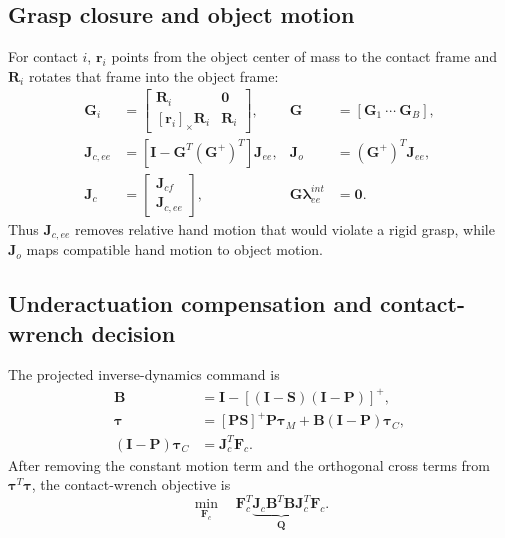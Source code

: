 \documentclass[11pt]{article}
\newcommand{\vect}[1]{\bm{#1}}
\newcommand{\skewm}[1]{[#1]_{\times}}
\newcommand{\pinv}{^{+}}
\begin{document}
\subsection*{Grasp closure and object motion}
For contact $i$, $\vect r_i$ points from the object center of mass to the
contact frame and $\vect R_i$ rotates that frame into the object frame:
\begin{align}
\vect G_i&=
\begin{bmatrix}
\vect R_i&\vect0\\
\skewm{\vect r_i}\vect R_i&\vect R_i
\end{bmatrix},
&\vect G&=[\vect G_1\ \cdots\ \vect G_B], \tag{PIDC-09}\\
\vect J_{c,ee}
&=\left[\vect I-\vect G^T(\vect G\pinv)^T\right]\vect J_{ee},
&\vect J_o&=(\vect G\pinv)^T\vect J_{ee}, \tag{PIDC-10}\\
\vect J_c&=
\begin{bmatrix}\vect J_{cf}\\\vect J_{c,ee}\end{bmatrix},
&\vect G\vect\lambda_{ee}^{int}&=\vect0. \tag{PIDC-11}
\end{align}
Thus $\vect J_{c,ee}$ removes relative hand motion that would violate a rigid
grasp, while $\vect J_o$ maps compatible hand motion to object motion.

\subsection*{Underactuation compensation and contact-wrench decision}
The projected inverse-dynamics command is
\begin{align}
\vect B&=\vect I-[(\vect I-\vect S)(\vect I-\vect P)]\pinv,
\tag{PIDC-12a}\\
\vect\tau
&=[\vect P\vect S]\pinv\vect P\vect\tau_M
+\vect B(\vect I-\vect P)\vect\tau_C, \tag{PIDC-12b}\\
(\vect I-\vect P)\vect\tau_C&=\vect J_c^T\vect F_c. \tag{PIDC-12c}
\end{align}
After removing the constant motion term and the orthogonal cross terms from
$\vect\tau^T\vect\tau$, the contact-wrench objective is
\begin{equation}
\min_{\vect F_c}\quad
\vect F_c^T
\underbrace{\vect J_c\vect B^T\vect B\vect J_c^T}_{\vect Q}
\vect F_c.
\tag{PIDC-13}
\end{equation}
\end{document}
